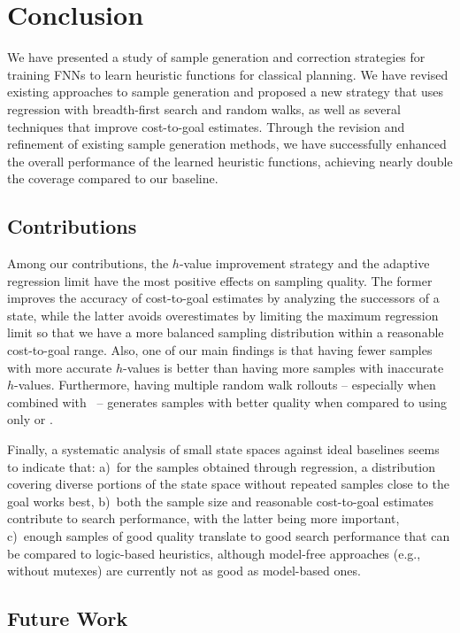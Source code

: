 \chapter{Conclusion}
\label{sec:conclusion}

We have presented a study of sample generation and correction strategies for training FNNs to learn heuristic functions for classical planning. We have revised existing approaches to sample generation and proposed a new strategy that uses regression with breadth-first search and random walks, as well as several techniques that improve cost-to-goal estimates. Through the revision and refinement of existing sample generation methods, we have successfully enhanced the overall performance of the learned heuristic functions, achieving nearly double the coverage compared to our baseline.

\section{Contributions}

Among our contributions, the $h$-value improvement strategy \hvfc and the adaptive regression limit \meanfx have the most positive effects on sampling quality. The former improves the accuracy of cost-to-goal estimates by analyzing the successors of a state, while the latter avoids overestimates by limiting the maximum regression limit so that we have a more balanced sampling distribution within a reasonable cost-to-goal range. Also, one of our main findings is that having fewer samples with more accurate $h$-values is better than having more samples with inaccurate $h$-values. Furthermore, having multiple random walk rollouts -- especially when combined with \bfs~-- generates samples with better quality when compared to using only \bfs or \dfs.

Finally, a systematic analysis of small state spaces against ideal baselines seems to indicate that: a)~for the samples obtained through regression, a distribution covering diverse portions of the state space without repeated samples close to the goal works best, b)~both the sample size and reasonable cost-to-goal estimates contribute to search performance, with the latter being more important, c)~enough samples of good quality translate to good search performance that can be compared to logic-based heuristics, although model-free approaches (e.g., without mutexes) are currently not as good as model-based ones.

\section{Future Work}


